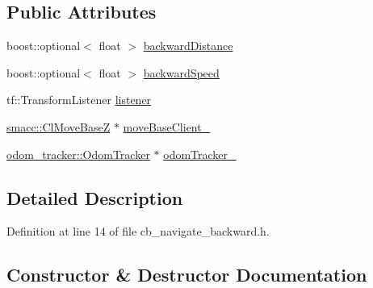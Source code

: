 \subsection*{Public Attributes}
\begin{DoxyCompactItemize}
\item 
boost\+::optional$<$ float $>$ \hyperlink{classsm__dance__bot_1_1move__base__z__client_1_1CbNavigateBackwards_a4067b6379c6f1c8e7d6d90a1206e98f8}{backward\+Distance}
\item 
boost\+::optional$<$ float $>$ \hyperlink{classsm__dance__bot_1_1move__base__z__client_1_1CbNavigateBackwards_a175ffec2b79c411ee1b88cff62ed37e9}{backward\+Speed}
\item 
tf\+::\+Transform\+Listener \hyperlink{classsm__dance__bot_1_1move__base__z__client_1_1CbNavigateBackwards_aeaaa632b142737c65bc87587aa02a3bf}{listener}
\item 
\hyperlink{classsmacc_1_1ClMoveBaseZ}{smacc\+::\+Cl\+Move\+BaseZ} $\ast$ \hyperlink{classsm__dance__bot_1_1move__base__z__client_1_1CbNavigateBackwards_a03ed133f7064857034dd7eadf0618674}{move\+Base\+Client\+\_\+}
\item 
\hyperlink{classodom__tracker_1_1OdomTracker}{odom\+\_\+tracker\+::\+Odom\+Tracker} $\ast$ \hyperlink{classsm__dance__bot_1_1move__base__z__client_1_1CbNavigateBackwards_acccdc0dd0d8810193f85a6bbbbe7effb}{odom\+Tracker\+\_\+}
\end{DoxyCompactItemize}


\subsection{Detailed Description}


Definition at line 14 of file cb\+\_\+navigate\+\_\+backward.\+h.



\subsection{Constructor \& Destructor Documentation}
